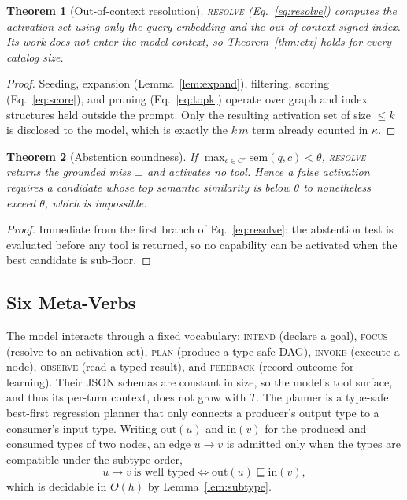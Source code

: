 \documentclass[11pt]{article}
\theoremstyle{plain}
\newtheorem{theorem}{Theorem}
\theoremstyle{definition}
\begin{document}
\begin{theorem}[Out-of-context resolution]
\label{thm:resolver}
\textsc{resolve} (Eq.~\eqref{eq:resolve}) computes the activation set using only
the query embedding and the out-of-context signed index. Its work does not enter
the model context, so Theorem~\ref{thm:ctx} holds for every catalog size.
\end{theorem}
\begin{proof}
Seeding, expansion (Lemma~\ref{lem:expand}), filtering, scoring
(Eq.~\eqref{eq:score}), and pruning (Eq.~\eqref{eq:topk}) operate over graph and
index structures held outside the prompt. Only the resulting activation set of
size $\le k$ is disclosed to the model, which is exactly the $k\,m$ term already
counted in $\kappa$.
\end{proof}

\begin{theorem}[Abstention soundness]
\label{thm:abstain}
If $\max_{c\in C'}\mathrm{sem}(q,c) < \theta$, \textsc{resolve} returns the
grounded miss $\bot$ and activates no tool. Hence a false activation requires a
candidate whose top semantic similarity is below $\theta$ to nonetheless exceed
$\theta$, which is impossible.
\end{theorem}
\begin{proof}
Immediate from the first branch of Eq.~\eqref{eq:resolve}: the abstention test is
evaluated before any tool is returned, so no capability can be activated when the
best candidate is sub-floor.
\end{proof}

\subsection{Six Meta-Verbs}
The model interacts through a fixed vocabulary:
\textsc{intend} (declare a goal), \textsc{focus} (resolve to an activation set),
\textsc{plan} (produce a type-safe DAG), \textsc{invoke} (execute a node),
\textsc{observe} (read a typed result), and \textsc{feedback} (record outcome
for learning). Their JSON schemas are constant in size, so the model's tool
surface, and thus its per-turn context, does not grow with $T$. The planner is
a type-safe best-first regression planner that only connects a producer's output
type to a consumer's input type. Writing $\mathrm{out}(u)$ and $\mathrm{in}(v)$
for the produced and consumed types of two nodes, an edge $u\to v$ is admitted
only when the types are compatible under the subtype order,
\begin{equation}
\label{eq:wt}
u \to v \ \text{is well typed} \iff \mathrm{out}(u) \sqsubseteq \mathrm{in}(v),
\end{equation}
which is decidable in $O(h)$ by Lemma~\ref{lem:subtype}.
\end{document}
